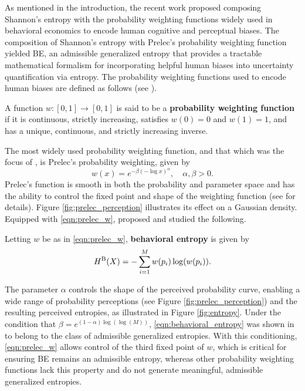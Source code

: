 As mentioned in the introduction, the recent work \citep{suresh2024robotic} proposed composing Shannon's entropy with the probability weighting functions widely used in behavioral economics to encode human cognitive and perceptual biases. The composition of Shannon's entropy with Prelec's probability weighting function \cite{prelec1998probability} yielded BE, an admissible generalized entropy that provides a tractable mathematical formalism for incorporating helpful human biases into uncertainty quantification via entropy. The probability weighting functions used to encode human biases are defined as follows (see \citep[Ch. 2.2]{dhami2016foundations}).
%
\begin{definition} \label{def:prob_weighting}
    A function $w : [0, 1] \rightarrow [0, 1]$ is said to be a \textbf{probability weighting function} if it is continuous, strictly increasing, satisfies $w(0) = 0$ and $w(1) = 1$, and has a unique, continuous, and strictly increasing inverse.
\end{definition}
%
The most widely used probability weighting function, and that which was the focus of \cite{suresh2024robotic}, is Prelec's probability weighting, given by
%
\begin{equation} \label{eqn:prelec_w}
    w(x) = e^{-\beta(-\log x)^{\alpha}}, \quad \alpha, \beta > 0.
\end{equation}
%
Prelec's function is smooth in both the probability and parameter space and has the ability to control the fixed point and shape of the weighting function (see \citep{prelec1998probability, dhami2016foundations} for details). Figure \ref{fig:prelec_perception} illustrates its effect on a Gaussian density.
%
Equipped with \eqref{eqn:prelec_w}, \cite{suresh2024robotic} proposed and studied the following.
%
\begin{definition} Letting $w$ be as in \eqref{eqn:prelec_w}, \textbf{behavioral entropy} is given by
    \begin{equation} \label{eqn:behavioral_entropy}
        H^{\textup{B}}(X) = -\sum_{i=1}^M w(p_i) \log(w(p_i)).
    \end{equation}
\end{definition}
%
The parameter $\alpha$ controls the shape of the perceived probability curve, enabling a wide range of probability perceptions (see Figure \ref{fig:prelec_perception}) and the resulting perceived entropies, as illustrated in Figure \ref{fig:entropy}. Under the condition that $\beta = e^{(1-\alpha)\log(\log(M))}$, \eqref{eqn:behavioral_entropy} was shown in \cite{suresh2024robotic} to belong to the class of admissible generalized entropies. 
%
With this conditioning, \eqref{eqn:prelec_w} allows control of the third fixed point of $w$, which is critical for ensuring BE remains an admissible entropy, whereas other probability weighting functions lack this property \citep{dhami2016foundations} and do not generate meaningful, admissible generalized entropies.

